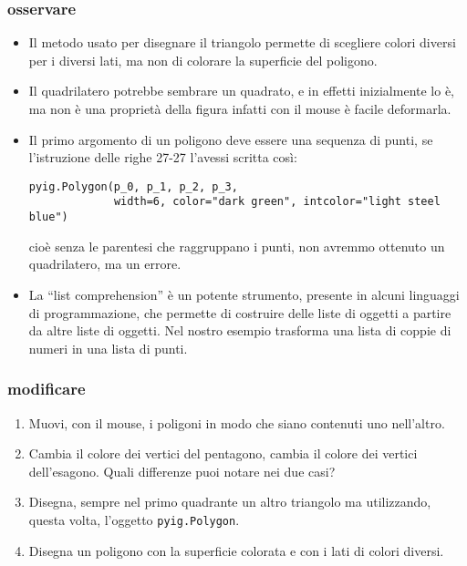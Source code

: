 \subsubsection{osservare}

\begin{itemize}
 \item Il metodo usato per disegnare il triangolo permette di scegliere colori 
diversi per i diversi lati, ma non di colorare la superficie del poligono.
 \item Il quadrilatero potrebbe sembrare un quadrato, e in effetti inizialmente 
lo è, ma non è una proprietà della figura infatti con il mouse è facile 
deformarla.
 \item 
Il primo argomento di un poligono deve essere una sequenza di punti, se 
l'istruzione delle righe 27-27 l'avessi scritta così:
\begin{lstlisting}[firstnumber=27]
pyig.Polygon(p_0, p_1, p_2, p_3,
             width=6, color="dark green", intcolor="light steel blue")
\end{lstlisting}
cioè senza le parentesi che raggruppano i punti, non avremmo ottenuto un 
quadrilatero, ma un errore.
 \item La ``list comprehension'' è un potente strumento, presente in alcuni 
linguaggi di programmazione, che permette di costruire delle liste di oggetti a 
partire da altre liste di oggetti. Nel nostro esempio trasforma una lista di 
coppie di numeri in una lista di punti.
\end{itemize}

\subsubsection{modificare}

\begin{enumerate} [noitemsep]
 \item Muovi, con il mouse, i poligoni in modo che siano contenuti uno 
nell'altro.
 \item Cambia il colore dei vertici del pentagono, cambia il colore dei vertici 
dell'esagono. Quali differenze puoi notare nei due casi?
 \item Disegna, sempre nel primo quadrante un altro triangolo ma utilizzando, 
questa volta, l'oggetto \lstinline{pyig.Polygon}.
 \item Disegna un poligono con la superficie colorata e con i lati di colori 
diversi.
\end{enumerate}

